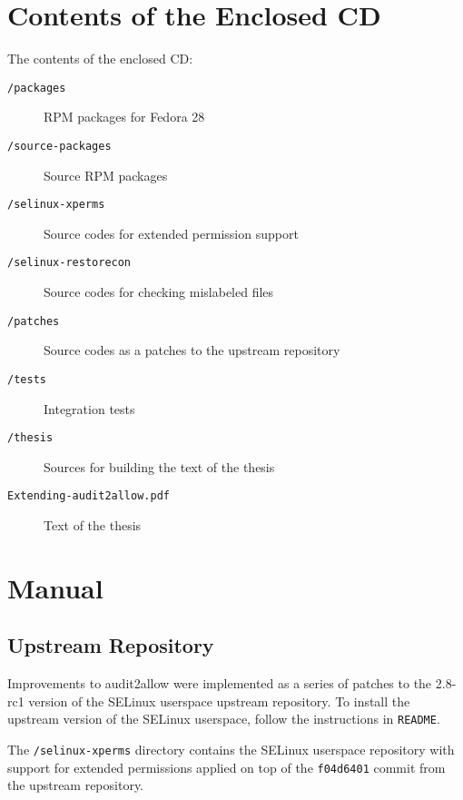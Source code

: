 
\chapter{Contents of the Enclosed CD}

The contents of the enclosed CD:
\begin{description}
    \item [\texttt{/packages}] RPM packages for Fedora 28
    \item [\texttt{/source-packages}] Source RPM packages
    \item [\texttt{/selinux-xperms}] Source codes for extended permission support
    \item [\texttt{/selinux-restorecon}] Source codes for checking mislabeled
        files
    \item [\texttt{/patches}] Source codes as a patches to the upstream
        repository
    \item [\texttt{/tests}] Integration tests
    \item [\texttt{/thesis}] Sources for building the text of the thesis
    \item [\texttt{Extending-audit2allow.pdf}] Text of the thesis
\end{description}

\chapter{Manual}

\section{Upstream Repository}

Improvements to audit2allow were implemented as a series of patches to the
2.8-rc1 version of the SELinux userspace upstream repository. To install the
upstream version of the SELinux userspace, follow the instructions in
\texttt{README}.

The \texttt{/selinux-xperms} directory contains the SELinux userspace repository
with support for extended permissions applied on top of the \texttt{f04d6401}
commit from the upstream repository.

